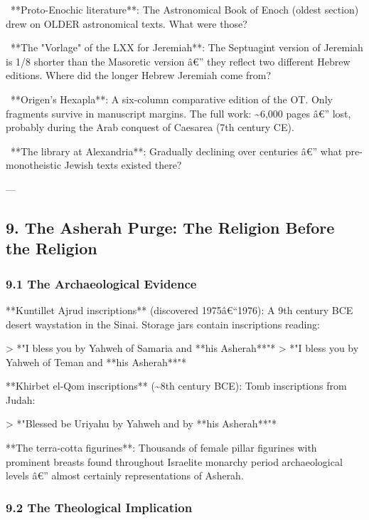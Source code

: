 \documentclass[aps,prd,11pt,onecolumn,superscriptaddress,nofootinbib,floatfix]{revtex4-2}
\begin{document}
\textbullet~**Proto-Enochic literature**: The Astronomical Book of Enoch (oldest section) drew on OLDER astronomical texts. What were those?

\textbullet~**The "Vorlage" of the LXX for Jeremiah**: The Septuagint version of Jeremiah is 1/8 shorter than the Masoretic version â€'' they reflect two different Hebrew editions. Where did the longer Hebrew Jeremiah come from?

\textbullet~**Origen's Hexapla**: A six-column comparative edition of the OT. Only fragments survive in manuscript margins. The full work: \textasciitilde{}6,000 pages â€'' lost, probably during the Arab conquest of Caesarea (7th century CE).

\textbullet~**The library at Alexandria**: Gradually declining over centuries â€'' what pre-monotheistic Jewish texts existed there?



---


\subsection{9. The Asherah Purge: The Religion Before the Religion}


\subsubsection{9.1 The Archaeological Evidence}


**Kuntillet Ajrud inscriptions** (discovered 1975â€``1976): A 9th century BCE desert waystation in the Sinai. Storage jars contain inscriptions reading:


> *"I bless you by Yahweh of Samaria and **his Asherah**"*
> *"I bless you by Yahweh of Teman and **his Asherah**"*


**Khirbet el-Qom inscriptions** (\textasciitilde{}8th century BCE): Tomb inscriptions from Judah:


> *"Blessed be Uriyahu by Yahweh and by **his Asherah**"*


**The terra-cotta figurines**: Thousands of female pillar figurines with prominent breasts found throughout Israelite monarchy period archaeological levels â€'' almost certainly representations of Asherah.


\subsubsection{9.2 The Theological Implication}
\end{document}
